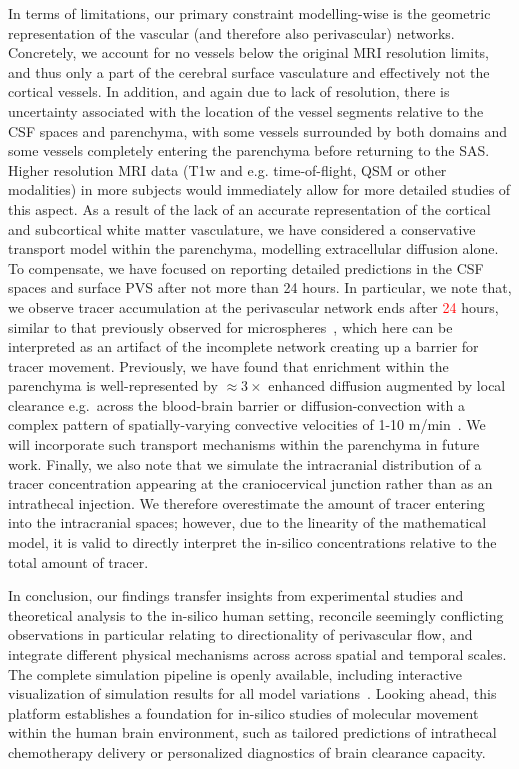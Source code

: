 \documentclass[fleqn,10pt]{wlscirep}
\newcommand{\fixme}[1]{\textcolor{red}{#1}}
\begin{document}

In terms of limitations, our primary constraint modelling-wise is the
geometric representation of the vascular (and therefore also
perivascular) networks. Concretely, we account for no vessels below
the original MRI resolution limits, and thus only a part of the
cerebral surface vasculature and effectively not the cortical
vessels. In addition, and again due to lack of resolution, there is
uncertainty associated with the location of the vessel segments
relative to the CSF spaces and parenchyma, with some vessels
surrounded by both domains and some vessels completely entering the
parenchyma before returning to the SAS. Higher resolution MRI data
(T1w and e.g. time-of-flight, QSM or other modalities) in more
subjects would immediately allow for more detailed studies of this
aspect. As a result of the lack of an accurate representation of the
cortical and subcortical white matter vasculature, we have considered
a conservative transport model within the parenchyma, modelling
extracellular diffusion alone. To compensate, we have focused on
reporting detailed predictions in the CSF spaces and surface PVS after
not more than 24 hours. In particular, we note that, we observe tracer
accumulation at the perivascular network ends after \fixme{24} hours,
similar to that previously observed for
microspheres~\cite{bedussi2018paravascular, mestre2018flow}, which
here can be interpreted as an artifact of the incomplete network
creating up a barrier for tracer movement. Previously, we have found
that enrichment within the parenchyma is well-represented by $\approx
3\times$ enhanced diffusion augmented by local clearance e.g.~across
the blood-brain barrier or diffusion-convection with a complex pattern
of spatially-varying convective velocities of 1-10 \textmu
m/min~\cite{vinje2023human}. We will incorporate such transport
mechanisms within the parenchyma in future work. Finally, we also note
that we simulate the intracranial distribution of a tracer
concentration appearing at the craniocervical junction rather than as
an intrathecal injection. We therefore overestimate the amount of
tracer entering into the intracranial spaces; however, due to the
linearity of the mathematical model, it is valid to directly interpret
the in-silico concentrations relative to the total amount of tracer.

In conclusion, our findings transfer insights from experimental
studies and theoretical analysis to the in-silico human setting,
reconcile seemingly conflicting observations in particular relating to
directionality of perivascular flow, and integrate different physical
mechanisms across across spatial and temporal scales. The complete
simulation pipeline is openly available, including interactive
visualization of simulation results for all model
variations~\cite{ZENODO}. Looking ahead, this platform establishes a
foundation for in-silico studies of molecular movement within the
human brain environment, such as tailored predictions of intrathecal
chemotherapy delivery or personalized diagnostics of brain clearance
capacity.
\end{document}
